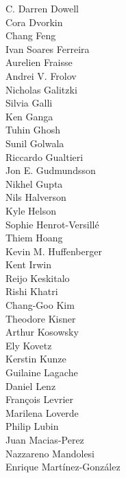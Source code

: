 \documentclass[PICOAPC.tex]{subfiles}
\begin{document}
{\begin{multicols}{4}
C. Darren Dowell                \\
Cora Dvorkin                    \\
Chang Feng                      \\
Ivan Soares Ferreira            \\
Aurelien Fraisse                \\
Andrei V. Frolov                \\
Nicholas Galitzki               \\
Silvia Galli                    \\
Ken Ganga                       \\
Tuhin Ghosh                     \\
Sunil Golwala                   \\
Riccardo Gualtieri              \\
Jon E. Gudmundsson              \\
Nikhel Gupta                    \\
Nils Halverson                  \\
Kyle Helson                     \\
Sophie Henrot-Versill\'e        \\
Thiem Hoang                     \\
Kevin M. Huffenberger           \\
Kent Irwin                      \\
Reijo Keskitalo                 \\
Rishi Khatri                    \\
Chang-Goo Kim                   \\
Theodore Kisner                 \\
Arthur Kosowsky                 \\
Ely Kovetz                      \\
Kerstin Kunze                   \\
Guilaine Lagache                \\
Daniel Lenz                     \\
Fran\c{c}ois Levrier            \\
Marilena Loverde                \\
Philip Lubin                    \\
Juan Macias-Perez               \\
Nazzareno Mandolesi             \\
Enrique Mart\'{i}nez-Gonz\'{a}lez   \\

\end{multicols}}
\end{document}
